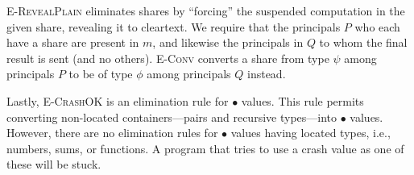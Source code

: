 \documentclass[10pt]{article}
\newcommand{\rulelab}[1]{{\small \textsc{#1}}}
\newcommand{\kw}[1]{\ensuremath{\mathtt{#1}}}
\newcommand{\epar}[2]{\ensuremath{\kw{par}~{#1}~{#2}}}
\newcommand{\vcrash}{\ensuremath{\bullet}}
\begin{document}
\rulelab{E-RevealPlain} eliminates shares by ``forcing'' the suspended
computation in the given share, revealing it to cleartext. We require
that the principals $P$ who each have a share are present in $m$, and
likewise the principals in $Q$ to whom the final result is sent (and
no others). \rulelab{E-Conv} converts a share from type $\psi$ among
principals $P$ to be of type $\phi$ among principals $Q$ instead.

Lastly, \rulelab{E-CrashOK} is an elimination rule for $\vcrash$
values. This rule permits converting non-located containers---pairs
and recursive types---into $\vcrash$ values. However, there are no
elimination rules for $\vcrash$ values having located types, i.e.,
numbers, sums, or functions. A program that tries to use a crash value
as one of these will be stuck.





\end{document}
